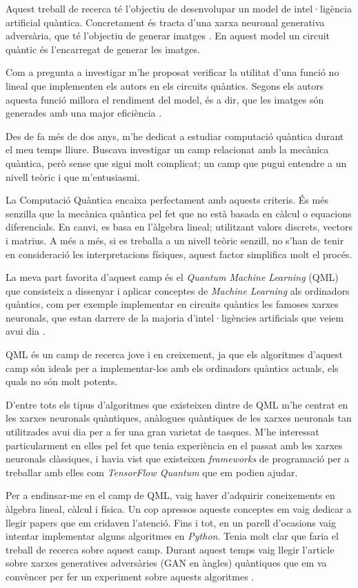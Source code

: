 Aquest treball de recerca té l'objectiu de desenvolupar un model de intel·ligència artificial quàntica. Concretament és tracta d'una xarxa neuronal generativa adversària, que té l'objectiu de generar imatges \cite{QGAN_exp, GAN2014}. En aquest model un circuit quàntic és l'encarregat de generar les imatges.

Com a pregunta a investigar m'he proposat verificar la utilitat d'una funció no lineal que implementen els autors en els circuits quàntics. Segons els autors aquesta funció millora el rendiment del model, és a dir, que les imatges són generades amb una major eficiència \cite{QGAN_exp}.

Des de fa més de dos anys, m'he dedicat a estudiar computació quàntica durant el meu temps lliure. Buscava investigar un camp relacionat amb la mecànica quàntica, però sense que sigui molt complicat; un camp que pugui entendre a un nivell teòric i que m'entusiasmi.

La Computació Quàntica encaixa perfectament amb aquests criteris. És més senzilla que la mecànica quàntica pel fet que no està basada en càlcul o equacions diferencials. En canvi, es basa en l'àlgebra lineal; utilitzant valors discrets, vectors i matrius. A més a més, si es treballa a un nivell teòric senzill, no s'han de tenir en consideració les interpretacions físiques, aquest factor simplifica molt el procés.

La meva part favorita d'aquest camp és el \textit{Quantum Machine Learning} (QML) que consisteix a dissenyar i aplicar conceptes de \textit{Machine Learning} als ordinadors quàntics, com per exemple implementar en circuits quàntics les famoses xarxes neuronals, que estan darrere de la majoria d'intel·ligències artificials que veiem avui dia \cite{schuld:2014}.

QML és un camp de recerca jove i en creixement, ja que els algoritmes d'aquest camp són ideals per a implementar-los amb els ordinadors quàntics actuals, els quals no són molt potents.

D'entre tots els tipus d'algoritmes que existeixen dintre de QML m'he centrat en les xarxes neuronals quàntiques, anàlogues quàntiques de les xarxes neuronals tan utilitzades avui dia per a fer una gran varietat de tasques. M'he interessat particularment en elles pel fet que tenia experiència en el passat amb les xarxes neuronals clàssiques, i havia vist que existeixen \textit{frameworks} de programació per a treballar amb elles com \textit{TensorFlow Quantum} \cite{tfq} que em podien ajudar.

Per a endinsar-me en el camp de QML, vaig haver d'adquirir coneixements en àlgebra lineal, càlcul i física. Un cop apressos aquests conceptes em vaig dedicar a llegir papers que em cridaven l'atenció. Fins i tot, en un parell d'ocasions vaig intentar implementar alguns algoritmes en \textit{Python}. Tenia molt clar que faria el treball de recerca sobre aquest camp. Durant aquest temps vaig llegir l'article sobre xarxes generatives adversàries (GAN en àngles) quàntiques que em va convèncer per fer un experiment sobre aquests algoritmes \cite{QGAN_exp}.




